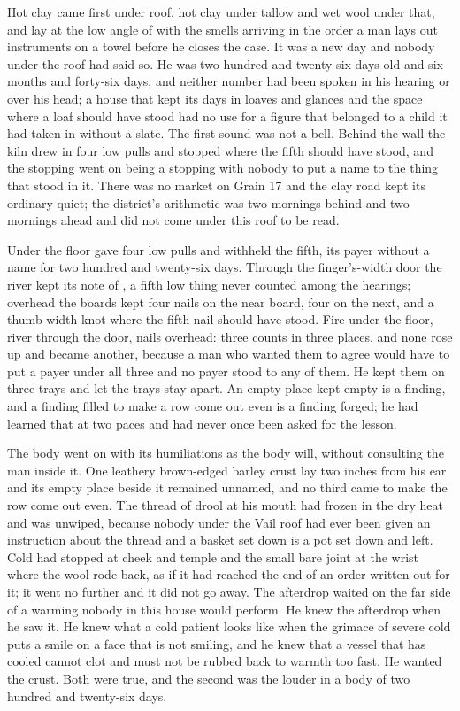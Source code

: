 
Hot clay came first under  roof, hot clay under tallow and wet wool under that, and  lay at the low angle of  with the smells arriving in the order a man lays out instruments on a towel before he closes the case. It was a new day and nobody under the roof had said so. He was two hundred and twenty-six days old and six months and forty-six days, and neither number had been spoken in his hearing or over his head; a house that kept its days in loaves and glances and the space where a loaf should have stood had no use for a figure that belonged to a child it had taken in without a slate. The first sound was not a bell. Behind the wall the kiln drew in four low pulls and stopped where the fifth should have stood, and the stopping went on being a stopping with nobody to put a name to the thing that stood in it. There was no market on Grain 17 and the clay road kept its ordinary quiet; the district's arithmetic was two mornings behind and two mornings ahead and did not come under this roof to be read.

Under the floor  gave four low pulls and withheld the fifth, its payer without a name for two hundred and twenty-six days. Through the finger's-width door the river kept its note of , a fifth low thing never counted among the hearings; overhead the boards kept four nails on the near board, four on the next, and a thumb-width knot where the fifth nail should have stood. Fire under the floor, river through the door, nails overhead: three counts in three places, and none rose up and became another, because a man who wanted them to agree would have to put a payer under all three and no payer stood to any of them. He kept them on three trays and let the trays stay apart. An empty place kept empty is a finding, and a finding filled to make a row come out even is a finding forged; he had learned that at two paces and had never once been asked for the lesson.

The body went on with its humiliations as the body will, without consulting the man inside it. One leathery brown-edged barley crust lay two inches from his ear and its empty place beside it remained unnamed, and no third came to make the row come out even. The thread of drool at his mouth had frozen in the dry heat and was unwiped, because nobody under the Vail roof had ever been given an instruction about the thread and a basket set down is a pot set down and left. Cold had stopped at cheek and temple and the small bare joint at the wrist where the wool rode back, as if it had reached the end of an order written out for it; it went no further and it did not go away. The afterdrop waited on the far side of a warming nobody in this house would perform. He knew the afterdrop when he saw it. He knew what a cold patient looks like when the grimace of severe cold puts a smile on a face that is not smiling, and he knew that a vessel that has cooled cannot clot and must not be rubbed back to warmth too fast. He wanted the crust. Both were true, and the second was the louder in a body of two hundred and twenty-six days.

